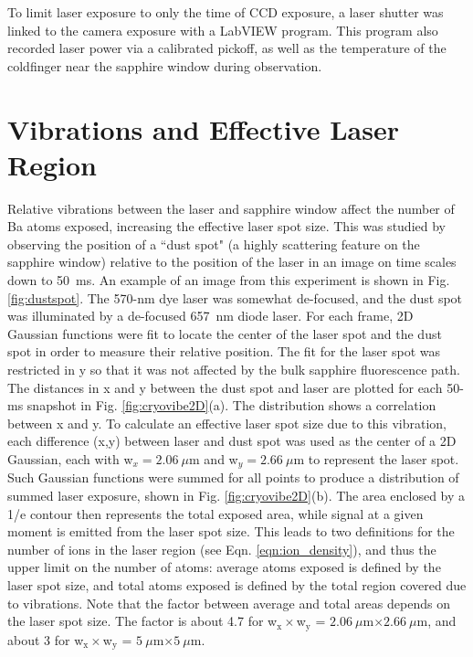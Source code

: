 
To limit laser exposure to only the time of CCD exposure, a laser shutter was linked to the camera exposure with a LabVIEW program.  This program also recorded laser power via a calibrated pickoff, as well as the temperature of the coldfinger near the sapphire window during observation.

\section{Vibrations and Effective Laser Region}
\label{sec:vibes}

Relative vibrations between the laser and sapphire window affect the number of Ba atoms exposed, increasing the effective laser spot size.  This was studied by observing the position of a ``dust spot" (a highly scattering feature on the sapphire window) relative to the position of the laser in an image on time scales down to 50~ms.  An example of an image from this experiment is shown in Fig. \ref{fig:dustspot}.  The 570-nm dye laser was somewhat de-focused, and the dust spot was illuminated by a de-focused 657~nm diode laser. For each frame, 2D Gaussian functions were fit to locate the center of the laser spot and the dust spot in order to measure their relative position.  The fit for the laser spot was restricted in y so that it was not affected by the bulk sapphire fluorescence path.  The distances in x and y between the dust spot and laser are plotted for each 50-ms snapshot in Fig. \ref{fig:cryovibe2D}(a).  The distribution shows a correlation between x and y.  To calculate an effective laser spot size due to this vibration, each difference (x,y) between laser and dust spot was used as the center of a 2D Gaussian, each with w$_{x} = 2.06~\mu$m and w$_{y} = 2.66~\mu$m to represent the laser spot.  Such Gaussian functions were summed for all points to produce a distribution of summed laser exposure, shown in Fig. \ref{fig:cryovibe2D}(b).  The area enclosed by a 1/e contour then represents the total exposed area, while signal at a given moment is emitted from the laser spot size.  This leads to two definitions for the number of ions in the laser region (see Eqn. \ref{eqn:ion_density}), and thus the upper limit on the number of atoms:  average atoms exposed is defined by the laser spot size, and total atoms exposed is defined by the total region covered due to vibrations.  Note that the factor between average and total areas depends on the laser spot size.  The factor is about 4.7 for w$_{\text{x}} \times $w$_{\text{y}}$ = $2.06~\mu$m$ \times 2.66~\mu$m, and about 3 for w$_{\text{x}} \times $w$_{\text{y}}$ = $5~\mu$m$ \times 5~\mu$m.

